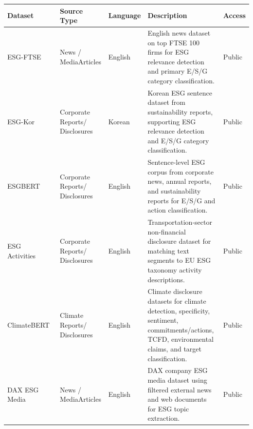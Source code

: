 \documentclass[11pt]{article}
\begin{document}
\begin{table}[t]
\centering
\scriptsize
\setlength{\tabcolsep}{3pt}
\renewcommand{\arraystretch}{1.12}
\begin{tabularx}{\textwidth}{@{}L{0.21\textwidth}L{0.12\textwidth}L{0.07\textwidth}Y L{0.05\textwidth}@{}}
\toprule
\textbf{Dataset} & \textbf{Source Type} & \textbf{Language} & \textbf{Description} & \textbf{Access} \\
\midrule

ESG-FTSE~\cite{pavlova2024esgftse}
& News / Media\newline Articles
& English
& English news dataset on top FTSE 100 firms for ESG relevance detection and primary E/S/G category classification.
& Public \\
\midrule

ESG-Kor~\cite{lee2024esgkor}
& Corporate Reports\newline / Disclosures
& Korean
& Korean ESG sentence dataset from sustainability reports, supporting ESG relevance detection and E/S/G category classification.
& Public \\
\midrule

ESGBERT~\cite{schimanski2024ESGBERT}
& Corporate Reports\newline / Disclosures
& English
& Sentence-level ESG corpus from corporate news, annual reports, and sustainability reports for E/S/G and action classification.
& Public \\
\midrule

ESG Activities~\cite{birti2025optimizing}
& Corporate Reports\newline / Disclosures
& English
& Transportation-sector non-financial disclosure dataset for matching text segments to EU ESG taxonomy activity descriptions.
& Public \\
\midrule

ClimateBERT~\cite{webersinke2021climatebert}
& Climate Reports\newline / Disclosures
& English
& Climate disclosure datasets for climate detection, specificity, sentiment, commitments/actions, TCFD, environmental claims, and target classification.
& Public \\
\midrule

DAX ESG Media~\cite{lipenkova2023detecting}
& News / Media\newline Articles
& English
& DAX company ESG media dataset using filtered external news and web documents for ESG topic extraction.
& Public \\
\midrule


\end{tabularx}
\end{table}
\end{document}
